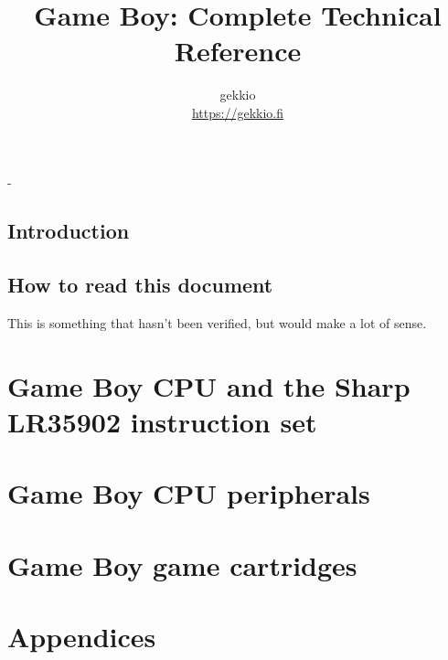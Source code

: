 \documentclass[a4paper, draft, oneside]{memoir}
\title{Game Boy: Complete Technical Reference}
\author{gekkio\\ \url{https://gekkio.fi}}
\begin{document}
\hypersetup{pageanchor=false}

\begin{titlingpage}
  \calccentering{\unitlength}
  \setlength{\droptitle}{80pt}
  \begin{adjustwidth*}{\unitlength}{-\unitlength}
    \maketitle
  \end{adjustwidth*}
\end{titlingpage}

\hypersetup{pageanchor=true}

\tableofcontents

\chapter*{Introduction}

\chapter*{How to read this document}

\begin{speculation}
  This is something that hasn't been verified, but would make a lot of sense.
\end{speculation}

\part{Game Boy CPU and the Sharp LR35902 instruction set}

\part{Game Boy CPU peripherals}

\part{Game Boy game cartridges}

\part*{Appendices}

\begin{appendices}


\end{appendices}


\end{document}
